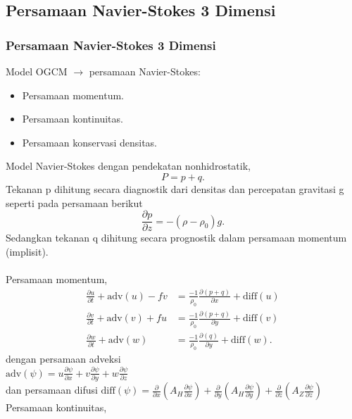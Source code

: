 \documentclass{beamer}
\begin{document}
\subsection{Persamaan Navier-Stokes 3 Dimensi}
\begin{frame}[allowframebreaks]
	\frametitle{Persamaan Navier-Stokes 3 Dimensi}
	Model OGCM $\rightarrow$ persamaan Navier-Stokes: 
	\begin{itemize}
		\item Persamaan momentum.
		\item Persamaan kontinuitas.
		\item Persamaan konservasi densitas.
	\end{itemize}
	Model Navier-Stokes dengan pendekatan nonhidrostatik, 
	\begin{equation}
		P = p+q.
	\end{equation}
	Tekanan p dihitung secara diagnostik dari densitas  dan percepatan gravitasi g seperti pada persamaan berikut 
	\begin{equation}
		\frac{\partial p}{\partial z} = -(\rho - \rho_0)g.
	\end{equation}
	Sedangkan tekanan q dihitung secara prognostik dalam persamaan momentum (implisit). \\ $\;$ \\
	Persamaan momentum,
	\begin{equation}
		\begin{aligned}
			\frac{\partial u}{\partial t} + \text{adv}(u)-fv &= \frac{-1}{\rho_0}\frac{\partial(p+q)}{\partial x}+\text{diff}(u) \\
			\frac{\partial v}{\partial t} + \text{adv}(v)+fu &= \frac{-1}{\rho_0}\frac{\partial(p+q)}{\partial y}+\text{diff}(v) \\
			\frac{\partial w}{\partial t} +\text{adv}(w) &= \frac{-1}{\rho_0}\frac{\partial(q)}{\partial y}+\text{diff}(w).
		\end{aligned}	
	\end{equation}
	dengan persamaan adveksi \\ $\text{adv}(\psi)=u\frac{\partial \psi}{\partial x}+v\frac{\partial \psi}{\partial y}+w\frac{\partial \psi}{\partial z}$ \\
	dan persamaan difusi $\text{diff}(\psi)=\frac{\partial}{\partial x}(A_{H} \frac{\partial \psi}{\partial x})+\frac{\partial}{\partial y}(A_{H} \frac{\partial \psi}{\partial y})+\frac{\partial}{\partial z}(A_{Z} \frac{\partial \psi}{\partial z})$
	\newpage 
	Persamaan kontinuitas,
	\begin{equation}

\end{equation}
\end{frame}
\end{document}
